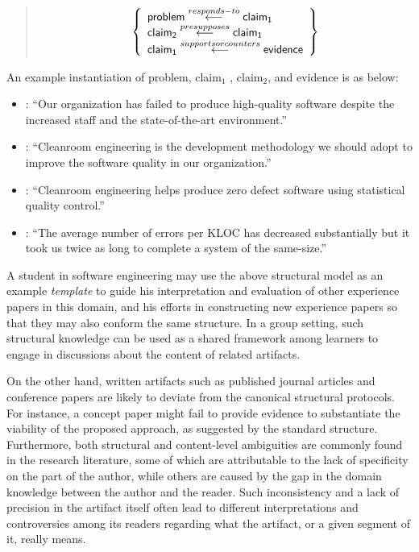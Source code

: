 \begin{quotation}
  \[ \left\{
\begin{array}{l}
  {\sf problem} \stackrel{ responds-to}{\longleftarrow} {\sf
   claim_{1}} \\

   {\sf  claim_{2}} \stackrel{presupposes}{\longleftarrow} {\sf
  claim_{1}} \\
  {\sf claim_{1} } \stackrel{supports or counters}{\longleftarrow} {\sf evidence} \\
\end{array} 
   \right \} \]
\end{quotation}

An example instantiation of {\sf problem}, {\sf
 claim\(_{1} \) }, {\sf  claim\(_{2} \)}, and {\sf
evidence\/} is as below:

\begin{itemize}
\item {}: ``Our organization has failed to produce
  high-quality software despite the increased staff and the
  state-of-the-art environment.''
  
\item {}: ``Cleanroom engineering is the
  development methodology we should adopt to improve the software quality
  in our organization.''
  
\item {}: ``Cleanroom engineering helps produce
  zero defect software using statistical quality control.'' 
  
\item {}: ``The average number of errors per KLOC
  has decreased substantially but it took us twice as long to complete a
  system of the same-size.''
\end{itemize}

A student in software engineering may use the above structural model as an
example {\it template\/} to guide his interpretation and evaluation of
other experience papers in this domain, and his efforts in constructing new
experience papers so that they may also conform the same structure. In a
group setting, such structural knowledge can be used as a shared framework
among learners to engage in discussions about the content of related
artifacts.

On the other hand, written artifacts such as published journal articles and
conference papers are likely to deviate from the canonical structural
protocols. For instance, a concept paper might fail to provide evidence to
substantiate the viability of the proposed approach, as suggested by the
standard structure.  Furthermore, both structural and content-level
ambiguities are commonly found in the research literature, some of which
are attributable to the lack of specificity on the part of the author,
while others are caused by the gap in the domain knowledge between the
author and the reader. Such inconsistency and a lack of precision in the
artifact itself often lead to different interpretations and controversies
among its readers regarding what the artifact, or a given segment of it,
really means.

